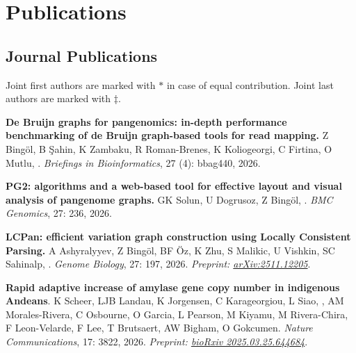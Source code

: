 \section{\sc Publications}
                                       
                                       \vspace{-0.5cm}
                                       
                                       \subsection{\small \sc Journal Publications}
                                       \vspace{-0.6cm}
                                       
                                       \small{
                                         Joint first authors are marked with $\ast$ in case of equal contribution. Joint last authors are marked with $\ddag$.
                                       }

\vspace{-.2cm}
    {\bf De Bruijn graphs for pangenomics: in-depth performance benchmarking of de Bruijn graph-based tools for read mapping.} Z Bingöl, B Şahin, K Zambaku, R Roman-Brenes, K Koliogeorgi, C Firtina, O Mutlu, \calkan{}. 
    {\it Briefings in Bioinformatics}, 27 (4): bbag440, 2026.

\vspace{-.2cm}
    {\bf PG2: algorithms and a web-based tool for effective layout and visual analysis of pangenome graphs.} GK Solun, U Dogrusoz, Z Bingöl, \calkan{}. 
    {\it BMC Genomics}, 27: 236, 2026.
    
\vspace{-.2cm}
    {\bf LCPan: efficient variation graph construction using Locally Consistent Parsing.} A Ashyralyyev, Z Bingöl, BF Öz, K Zhu, S Malikic, U Vishkin, SC Sahinalp, \calkan{}. 
    {\it Genome Biology}, 27: 197, 2026. \textit{Preprint: \href{https://doi.org/10.48550/arXiv.2511.12205}{arXiv:2511.12205}}.
    
\vspace{-.2cm}
    {\bf Rapid adaptive increase of amylase gene copy number in indigenous Andeans}. K Scheer, LJB Landau, K Jorgensen, C Karageorgiou, L Siao, \calkan{}, AM Morales-Rivera, C Osbourne, O Garcia, L Pearson, M Kiyamu, M Rivera-Chira, F Leon-Velarde, F Lee, T Brutsaert, AW Bigham, O Gokcumen. {\it Nature Communications}, 17: 3822, 2026. \textit{Preprint: \href{https://doi.org/10.1101/2025.03.25.644684}{bioRxiv 2025.03.25.644684}}.
    
